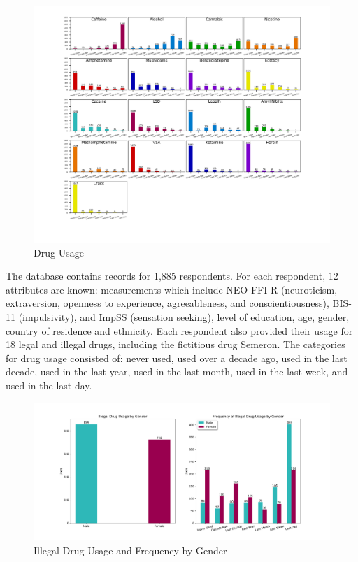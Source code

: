 \documentclass[10pt]{article}
\begin{document}
\begin{figure}[h]
\caption{Drug Usage}
\centering
\includegraphics[scale=0.7]{drugs.png}
\end{figure}

The database contains records for 1,885 respondents. For each respondent, 12 attributes are known: measurements which include NEO-FFI-R (neuroticism, extraversion, openness to experience, agreeableness, and conscientiousness), BIS-11 (impulsivity), and ImpSS (sensation seeking), level of education, age, gender, country of residence and ethnicity. Each respondent also provided their usage for 18 legal and illegal drugs, including the fictitious drug Semeron. The categories for drug usage consisted of: never used, used over a decade ago, used in the last decade, used in the last year, used in the last month, used in the last week, and used in the last day.

\begin{figure}[H]
\caption{Illegal Drug Usage and Frequency by Gender}
\label{fig:genders}
\centering
\includegraphics[scale=0.4]{gender_freq.png}
\end{figure}
\end{document}

